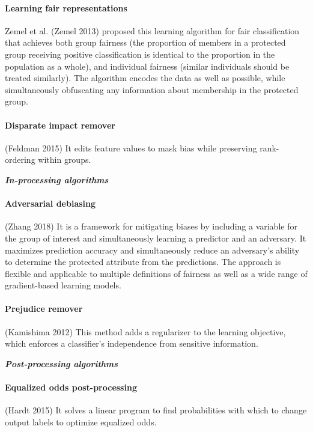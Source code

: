 \documentclass{article}
\begin{document}
 \paragraph{Learning fair representations}

 Zemel et al. (Zemel 2013) proposed this learning algorithm for fair classification that achieves both group fairness (the proportion of members in a protected group receiving positive classification is identical to the proportion in the population as a whole), and individual fairness (similar individuals should be treated similarly).  The algorithm encodes the data as well as possible, while simultaneously obfuscating any information about membership in the protected group.
 
  \paragraph{Disparate impact remover}(Feldman 2015) It edits feature values to mask bias while preserving rank-ordering within groups.
 
 \textbf{\textit{In-processing algorithms}}
\paragraph{Adversarial debiasing} (Zhang 2018) It is a framework for mitigating biases by including a variable for the group of interest and simultaneously learning a predictor and an adversary. It maximizes prediction accuracy and simultaneously reduce an adversary's ability to determine the protected attribute from the predictions. The approach is flexible and applicable to multiple definitions of fairness as well as a wide range of gradient-based learning models.
 \paragraph{Prejudice remover} (Kamishima 2012) This method adds a regularizer to the learning objective, which enforces a classifier's independence from sensitive information.
 
 \textbf{\textit{Post-processing algorithms}}

\paragraph{Equalized odds post-processing} (Hardt 2015) It solves a linear program to find probabilities with which to change output labels to optimize equalized odds. 
\end{document}

